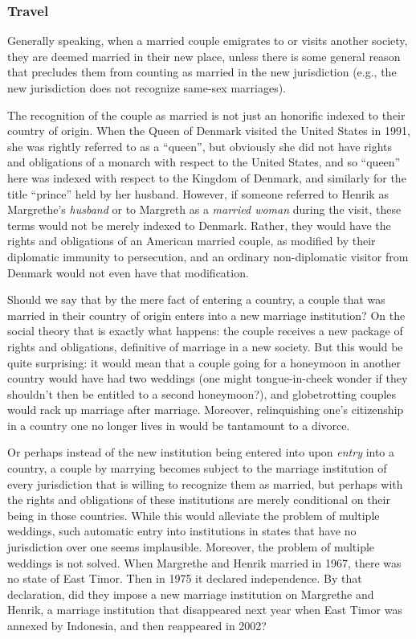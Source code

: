 \subsubsection{Travel}
Generally speaking, when a married couple emigrates to or visits another society, they are deemed married in their new place, unless there is some general reason that precludes them from counting as married in the new jurisdiction
(e.g., the new jurisdiction does not recognize same-sex marriages).

The recognition of the couple as married is not just an honorific indexed to their country of origin. When the Queen of Denmark visited the United States in 1991,
she was rightly referred to as a ``queen'', but obviously she did not have rights and obligations of a monarch with respect to the United States, and so ``queen''
here was indexed with respect to the Kingdom of Denmark, and similarly for the title ``prince'' held by her husband. However, if someone referred to Henrik
as Margrethe's \textit{husband} or to Margreth as a \textit{married woman} during the visit, these terms would not be merely indexed to Denmark. Rather, they would
have the rights and obligations of an American married couple, as modified by their diplomatic immunity to persecution, and an ordinary non-diplomatic visitor from
Denmark would not even have that modification.

Should we say that by the mere fact of entering a country, a couple that was married in their country of origin enters into a new marriage institution?
On the social theory that is exactly what happens: the couple receives a new package of rights and obligations, definitive of marriage in a new society.
But this would be quite surprising: it would mean that a couple going for a honeymoon in another country would have had two weddings (one might tongue-in-cheek wonder if
they shouldn't then be entitled to a second honeymoon?), and globetrotting couples would rack up marriage after marriage. Moreover, relinquishing one's
citizenship in a country one no longer lives in would be tantamount to a divorce.

Or perhaps instead of the new institution being entered into upon \textit{entry} into a country, a couple by marrying becomes subject to the marriage institution of every
jurisdiction that is willing to recognize them as married, but perhaps with the rights and obligations of these institutions are merely conditional on their being in
those countries. While this would alleviate the problem of multiple weddings, such automatic entry into institutions in states that have no jurisdiction over one seems implausible.
Moreover, the problem of multiple weddings is not solved. When Margrethe and Henrik married in 1967, there was no state of East Timor. Then in
1975 it declared independence. By that declaration, did they impose a new marriage institution on Margrethe and Henrik, a marriage institution that disappeared
next year when East Timor was annexed by Indonesia, and then reappeared in 2002?

